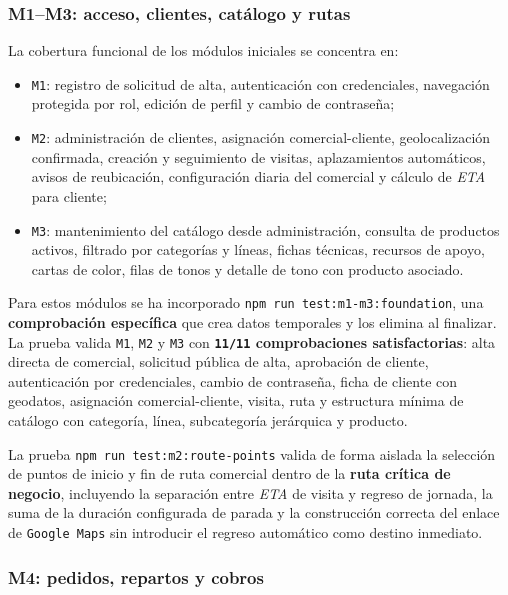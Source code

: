 \subsubsection{M1--M3: acceso, clientes, catálogo y rutas}

La cobertura funcional de los módulos iniciales se concentra en:

\begin{itemize}
    \item \texttt{M1}: registro de solicitud de alta, autenticación con credenciales, navegación protegida por rol, edición de perfil y cambio de contraseña;
    \item \texttt{M2}: administración de clientes, asignación comercial-cliente, geolocalización confirmada, creación y seguimiento de visitas, aplazamientos automáticos, avisos de reubicación, configuración diaria del comercial y cálculo de \textit{ETA} para cliente;
    \item \texttt{M3}: mantenimiento del catálogo desde administración, consulta de productos activos, filtrado por categorías y líneas, fichas técnicas, recursos de apoyo, cartas de color, filas de tonos y detalle de tono con producto asociado.
\end{itemize}

Para estos módulos se ha incorporado \texttt{npm run test:m1-m3:foundation}, una \textbf{comprobación específica} que crea datos temporales y los elimina al finalizar. La prueba valida \texttt{M1}, \texttt{M2} y \texttt{M3} con \textbf{\texttt{11/11} comprobaciones satisfactorias}: alta directa de comercial, solicitud pública de alta, aprobación de cliente, autenticación por credenciales, cambio de contraseña, ficha de cliente con geodatos, asignación comercial-cliente, visita, ruta y estructura mínima de catálogo con categoría, línea, subcategoría jerárquica y producto.

La prueba \texttt{npm run test:m2:route-points} valida de forma aislada la selección de puntos de inicio y fin de ruta comercial dentro de la \textbf{ruta crítica de negocio}, incluyendo la separación entre \textit{ETA} de visita y regreso de jornada, la suma de la duración configurada de parada y la construcción correcta del enlace de \texttt{Google Maps} sin introducir el regreso automático como destino inmediato.

\subsubsection{M4: pedidos, repartos y cobros}

